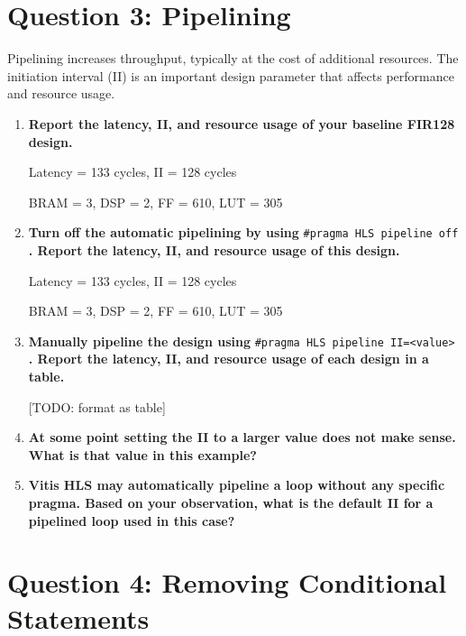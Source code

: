 \documentclass[12pt,a4paper]{article}
\begin{document}
\section*{Question 3: Pipelining}
Pipelining increases throughput, typically at the cost of additional resources.
The initiation interval (II) is an important design parameter that affects performance and resource usage.

\begin{enumerate}
    \item[(a)] \textbf{Report the latency, II, and resource usage of your baseline FIR128 design.}

        Latency = 133 cycles, II = 128 cycles

        BRAM = 3, DSP = 2, FF = 610, LUT = 305
    
    \item[(b)] \textbf{Turn off the automatic pipelining by using} \verb|#pragma HLS pipeline off| \textbf{. Report the latency, II, and resource usage of this design.}

        Latency = 133 cycles, II = 128 cycles 

        BRAM = 3, DSP = 2, FF = 610, LUT = 305

    \item[(c)] \textbf{Manually pipeline the design using} \verb|#pragma HLS pipeline II=<value>| \textbf{. Report the latency, II, and resource usage of each design in a table.}

        [TODO: format as table]

    \item[(d)] \textbf{At some point setting the II to a larger value does not make sense. What is that value in this example?}

    \item[(e)] \textbf{Vitis HLS may automatically pipeline a loop without any specific pragma. Based on your observation, what is the default II for a pipelined loop used in this case?}

\end{enumerate}


\section*{Question 4: Removing Conditional Statements}
\end{document}
